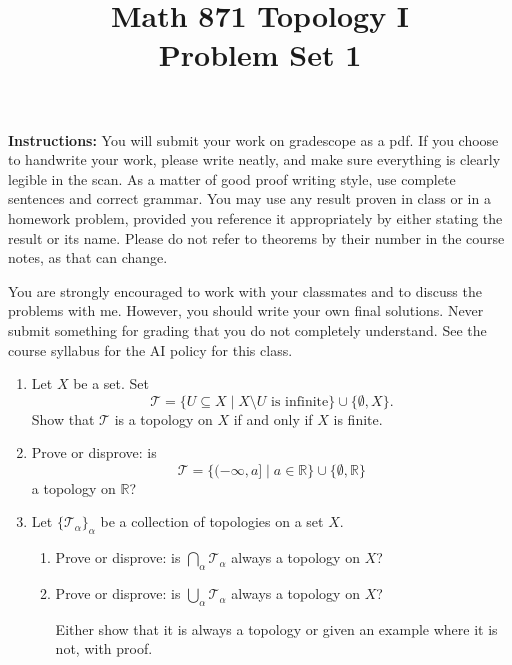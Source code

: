 \documentclass[12pt]{article}
\title{Math 871 Topology I\\[-0.1em]
\large Problem Set 1}
\author{}
\date{}
\newcommand{\R}{\mathbb{R}}
\newcommand{\T}{\mathcal{T}}
\begin{document}
\maketitle


	
\thispagestyle{fancy}
\pagestyle{fancy}





{\bf Instructions:}
You will submit your work on gradescope as a pdf. If you choose to handwrite your work, please write neatly, and make sure everything is clearly legible in the scan.
As a matter of good proof writing style, use complete sentences and correct grammar. You may use any result proven in class or in a homework problem, provided you reference it appropriately by either stating the result or its name. Please do not refer to theorems by their number in the course notes, as that can change.

You are strongly encouraged to work with your classmates and to discuss the problems with me. However, you should write your own final solutions.
Never submit something for grading that you do not completely understand. 
See the course syllabus for the AI policy for this class.
	
\vspace{2em}

\begin{enumerate}[roomy]


\item Let $X$ be a set. Set
\[ \T = \{U \subseteq X \mid X \setminus U \text{ is infinite}\} \cup \{\emptyset, X\}.\] 
Show that $\T$ is a topology on $X$ if and only if $X$ is finite.	
	

\item Prove or disprove: is
	\[ \T = \{(-\infty, a] \mid a \in \R\} \cup \{\emptyset, \R\}\]
	a topology on $\R$?
	

\item Let $\{ \T_{\alpha} \}_{\alpha}$ be a collection of topologies on a set $X$.

\begin{enumerate}
\item Prove or disprove: is $\displaystyle\bigcap_\alpha \T_{\alpha}$ always a topology on $X$?
\item Prove or disprove: is $\displaystyle\bigcup_\alpha \T_{\alpha}$ always a topology on $X$?

\noindent
Either show that it is always a topology or given an example where it is not, with proof.
\end{enumerate}
\end{enumerate}
\end{document}
